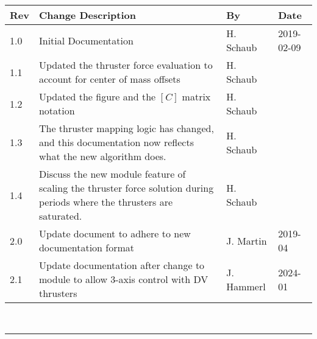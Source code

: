\documentclass[]{BasiliskReportMemo}
\begin{document}
\makeCover
%
%
\pagestyle{empty}
{\renewcommand{\arraystretch}{2}
\noindent
\begin{longtable}{|p{0.5in}|p{3.5in}|p{1.07in}|p{0.9in}|}
\hline
{\bfseries Rev} & {\bfseries Change Description} & {\bfseries By}& {\bfseries Date} \\
\hline
1.0 & Initial Documentation & H. Schaub & 2019-02-09\\
\hline
1.1 & Updated the thruster force evaluation to account for center of mass offsets & H. Schaub & \\
\hline
1.2 & Updated the figure and the $[C]$ matrix notation & H. Schaub & \\
\hline
1.3 & The thruster mapping logic has changed, and this documentation now reflects what the new algorithm does. & H. Schaub & \\
\hline
1.4 & Discuss the new module feature of scaling the thruster force solution during periods where the thrusters are saturated. & H. Schaub & \\
\hline
2.0 & Update document to adhere to new documentation format & J. Martin & 2019-04 \\
\hline
2.1 & Update documentation after change to module to allow 3-axis control with DV thrusters & J. Hammerl & 2024-01 \\
\hline

\end{longtable}
}



\newpage
\setcounter{page}{1}
\pagestyle{fancy}

\tableofcontents %
~\\ \hrule ~\\ %



	





\end{document}

